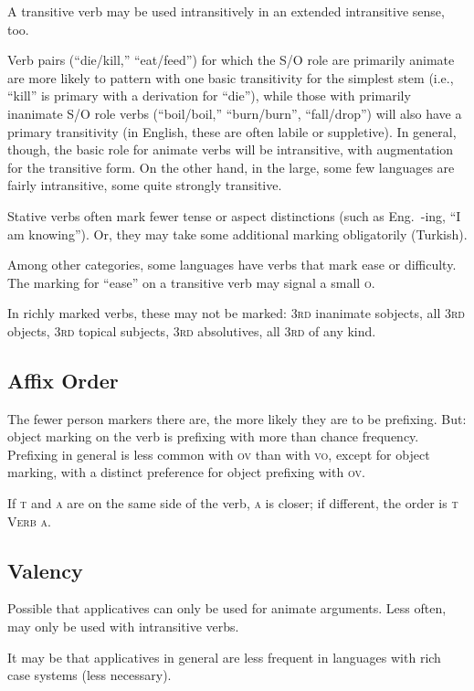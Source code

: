 \documentclass[11pt]{article}
\newcommand{\I}[1]{\textsc{#1}}   %
\begin{document}
A transitive verb may be used intransitively in an extended
intransitive sense, too.

Verb pairs (``die/kill,'' ``eat/feed'') for which the S/O role are
primarily animate are more likely to pattern with one basic
transitivity for the simplest stem (i.e., ``kill'' is primary with a
derivation for ``die''), while those with primarily inanimate S/O role
verbs (``boil/boil,'' ``burn/burn'', ``fall/drop'') will also have a
primary transitivity (in English, these are often labile or
suppletive).  In general, though, the basic role for animate verbs
will be intransitive, with augmentation for the transitive form.  On
the other hand, in the large, some few languages are fairly
intransitive, some quite strongly transitive.

Stative verbs often mark fewer tense or aspect distinctions (such as
Eng.\ -ing, ``I am knowing''). Or, they may take some additional
marking obligatorily (Turkish).

Among other categories, some languages have verbs that mark ease or
difficulty.  The marking for ``ease'' on a transitive verb may signal
a small \I{o}.

In richly marked verbs, these may not be marked: \I{3rd} inanimate
sobjects, all \I{3rd} objects, \I{3rd} topical subjects, \I{3rd}
absolutives, all \I{3rd} of any kind.


\subsection{Affix Order}
The fewer person markers there are, the more likely they are to be
prefixing.  But: object marking on the verb is prefixing with more
than chance frequency.  Prefixing in general is less common with
\I{ov} than with \I{vo}, except for object marking, with a distinct
preference for object prefixing with \I{ov}.

If \I{t} and \I{a} are on the same side of the verb, \I{a} is closer;
if different, the order is \I{t Verb a}.


\subsection{Valency}
Possible that applicatives can only be used for animate arguments.
Less often, may only be used with intransitive verbs.

It may be that applicatives in general are less frequent in languages
with rich case systems (less necessary).
\end{document}
